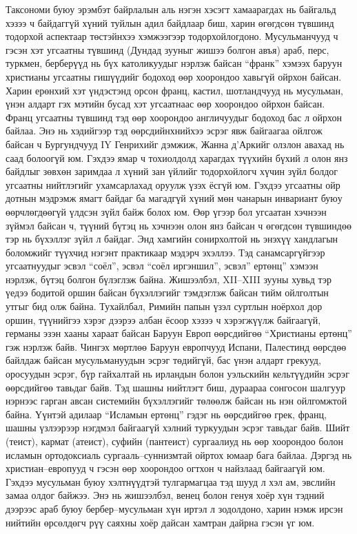 Таксономи буюу эрэмбэт байрлалын аль нэгэн хэсэгт хамаарагдах нь байгальд хэзээ ч байдаггүй хүний туйлын адил байдлаар биш, харин өгөгдсөн түвшинд тодорхой аспектаар төстэйнхээ хэмжээгээр тодорхойлогдоно. Мусульманчууд ч гэсэн хэт угсаатны түвшинд (Дундад зууныг жишээ болгон авъя) араб, перс, туркмен, берберүүд нь бүх католикуудыг нэрлэж байсан “франк” хэмээх баруун христианы угсаатны гишүүдийг бодоход өөр хоорондоо хавьгүй ойрхон байсан. Харин ерөнхий хэт үндэстэнд орсон франц, кастил, шотландчууд нь мусульман, үнэн алдарт гэх мэтийн бусад хэт угсаатнаас өөр хоорондоо ойрхон байсан. Франц угсаатны түвшинд тэд өөр хоорондоо англичуудыг бодоход бас л ойрхон байлаа. Энэ нь хэдийгээр тэд өөрсдийнхнийхээ эсрэг явж байгаагаа ойлгож байсан ч Бургундчууд IY Генрихийг дэмжиж, Жанна д’Аркийг олзлон авахад нь саад болоогүй юм. Гэхдээ ямар ч тохиолдолд харагдах түүхийн бүхий л олон янз байдлыг зөвхөн заримдаа л хүний зан үйлийг тодорхойлогч хүчин зүйл болдог угсаатны нийтлэгийг ухамсарлахад оруулж үзэх ёсгүй юм. Гэхдээ угсаатны ойр дотнын мэдрэмж ямагт байдаг ба магадгүй хүний мөн чанарын инвариант буюу өөрчлөгдөөгүй үлдсэн зүйл байж болох юм. Өөр үгээр бол угсаатан хэчнээн зүймэл байсан ч, түүний бүтэц нь хэчнээн олон янз байсан ч өгөгдсөн түвшиндөө тэр нь бүхэллэг зүйл л байдаг.
Энд хамгийн сонирхолтой нь энэхүү хандлагын боломжийг түүхчид нэгэнт практикаар мэдэрч эхэллээ. Тэд санамсаргүйгээр угсаатнуудыг эсвэл “соёл”, эсвэл “соёл иргэншил”, эсвэл” ертөнц” хэмээн нэрлэж, бүтэц болгон бүлэглэж байна. Жишээлбэл, XII–XIII зууны хувьд тэр үедээ бодитой оршин байсан бүхэллэгийг тэмдэглэж байсан тийм ойлголтын утгыг бид олж байна. Тухайлбал, Римийн папын үзэл суртлын ноёрхол дор оршин, түүнийгээ хэрэг дээрээ албан ёсоор хэзээ ч хэрэгжүүлж байгаагүй, германы эзэн хааны хараат байсан Баруун Европ өөрсдийгөө “Христианы ертөнц” гэж нэрлэж байв. Чингэх мөртлөө Баруун европчууд Испани, Палестинд өөрсдөө байлдаж байсан мусульмануудын эсрэг төдийгүй, бас үнэн алдарт грекууд, оросуудын эсрэг, бүр гайхалтай нь ирландын болон уэльскийн кельтүүдийн эсрэг өөрсдийгөө тавьдаг байв. Тэд шашны нийтлэгт биш, дураараа сонгосон шалгуур нэрнээс гарган авсан системийн бүхэллэгийг төлөөлж байсан нь нэн ойлгомжтой байна.
Үүнтэй адилаар “Исламын ертөнц” гэдэг нь өөрсдийгөө грек, франц, шашны үзлээрээр нэгдмэл байгаагүй хэлний туркуудын эсрэг тавьдаг байв. Шийт (теист), кармат (атеист), суфийн (пантеист) сургаалиуд нь өөр хоорондоо болон исламын ортодоксиаль сургааль–суннизмтай ойртох юмаар бага байлаа. Дэргэд нь христиан–европууд ч гэсэн өөр хоорондоо огтхон ч найзлаад байгаагүй юм. Гэхдээ мусульман буюу хэлтнүүдтэй тулгармагцаа тэд шууд л хэл ам, эвслийн замаа олдог байжээ. Энэ нь жишээлбэл, венец болон генуя хоёр хүн тэдний дээрээс араб буюу бербер–мусульман хүн иртэл л зодолдоно, харин нэмж ирсэн нийтийн өрсөлдөгч рүү саяхны хоёр дайсан хамтран дайрна гэсэн үг юм.
